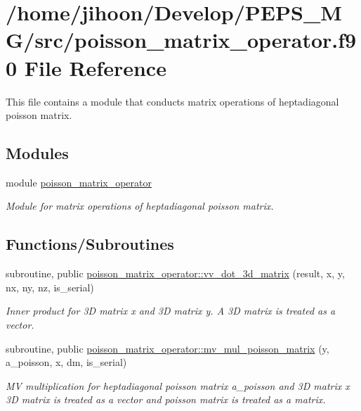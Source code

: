 \hypertarget{poisson__matrix__operator_8f90}{}\section{/home/jihoon/\+Develop/\+P\+E\+P\+S\+\_\+\+M\+G/src/poisson\+\_\+matrix\+\_\+operator.f90 File Reference}
\label{poisson__matrix__operator_8f90}


This file contains a module that conducts matrix operations of heptadiagonal poisson matrix.  


\subsection*{Modules}
\begin{DoxyCompactItemize}
\item 
module \hyperlink{namespacepoisson__matrix__operator}{poisson\+\_\+matrix\+\_\+operator}
\begin{DoxyCompactList}\small\item\em Module for matrix operations of heptadiagonal poisson matrix. \end{DoxyCompactList}\end{DoxyCompactItemize}
\subsection*{Functions/\+Subroutines}
\begin{DoxyCompactItemize}
\item 
subroutine, public \hyperlink{namespacepoisson__matrix__operator_a10219d15282e48b5afab88408912fb2f}{poisson\+\_\+matrix\+\_\+operator\+::vv\+\_\+dot\+\_\+3d\+\_\+matrix} (result, x, y, nx, ny, nz, is\+\_\+serial)
\begin{DoxyCompactList}\small\item\em Inner product for 3D matrix x and 3D matrix y. A 3D matrix is treated as a vector. \end{DoxyCompactList}\item 
subroutine, public \hyperlink{namespacepoisson__matrix__operator_a0a0591ff6a44595b830d4d0655e25106}{poisson\+\_\+matrix\+\_\+operator\+::mv\+\_\+mul\+\_\+poisson\+\_\+matrix} (y, a\+\_\+poisson, x, dm, is\+\_\+serial)
\begin{DoxyCompactList}\small\item\em MV multiplication for heptadiagonal poisson matrix a\+\_\+poisson and 3D matrix x 3D matrix is treated as a vector and poisson matrix is treated as a matrix. \end{DoxyCompactList}\end{DoxyCompactItemize}



